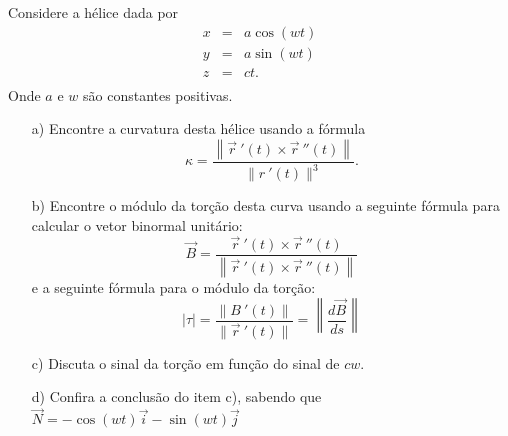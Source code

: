 \begin{exeresol}
Considere a hélice dada por
\begin{eqnarray*}
x&=&a\cos(wt)\\
y&=&a\sin(wt)\\
z&=&ct.\\
\end{eqnarray*}
Onde $a$ e $w$ são constantes positivas.
\begin{itemize}
\item[a)] Encontre  a curvatura desta hélice usando a fórmula
$$\kappa=\frac{\left\|\vec{r}\ \!'(t)\times \vec{r}\ \!''(t)\right\|}{\|r\ \!'(t)\|^3}.$$
\item[b)] Encontre o módulo da torção desta curva usando a seguinte fórmula para calcular o vetor binormal unitário: $$\vec{B}=\frac{\vec{r}\ \!'(t)\times \vec{r}\ \!''(t)}{\left\|\vec{r}\ \!'(t)\times \vec{r}\ \!''(t)\right\|}$$
e a seguinte fórmula para o módulo da torção:
$$|\tau|=\frac{\|B\ \!'(t)\|}{\|\vec{r}\ \!'(t)\|}=\left\|\frac{d\vec{B}}{ds}\right\|$$

\item[c)] Discuta o sinal da torção em função do sinal de $cw$. 
\item[d)] Confira a conclusão do item c), sabendo que $\vec{N}=-\cos(wt)\vec{i}-\sin(wt)\vec{j}$
\end{itemize}
\end{exeresol}
